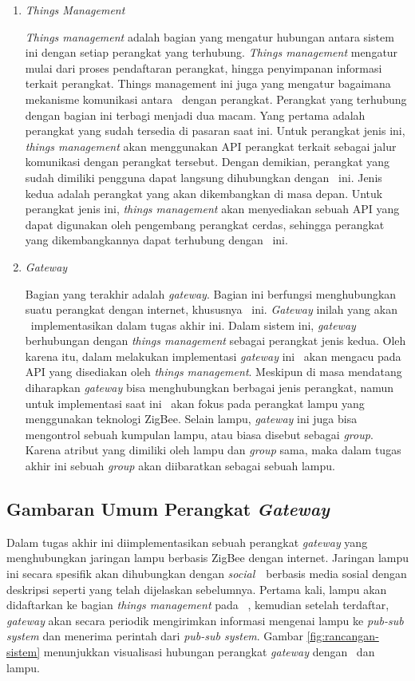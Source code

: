 \begin{enumerate}
	\item \textit{Things Management}
	
	\textit{Things management} adalah bagian yang mengatur hubungan antara sistem ini dengan setiap perangkat yang terhubung. \textit{Things management} mengatur mulai dari proses pendaftaran perangkat, hingga penyimpanan informasi terkait perangkat. Things management ini juga yang mengatur bagaimana mekanisme komunikasi antara \plat~dengan perangkat. Perangkat yang terhubung dengan bagian ini terbagi menjadi dua macam. Yang pertama adalah perangkat yang sudah tersedia di pasaran saat ini. Untuk perangkat jenis ini, \textit{things management} akan menggunakan API perangkat terkait sebagai jalur komunikasi dengan perangkat tersebut. Dengan demikian, perangkat yang sudah dimiliki pengguna dapat langsung dihubungkan dengan \plat~ini. Jenis kedua adalah perangkat yang akan dikembangkan di masa depan. Untuk perangkat jenis ini, \textit{things management} akan menyediakan sebuah API yang dapat digunakan oleh pengembang perangkat cerdas, sehingga perangkat yang dikembangkannya dapat terhubung dengan \plat~ini.
	
	\item \textit{Gateway}
	
	Bagian yang terakhir adalah \textit{gateway}. Bagian ini berfungsi menghubungkan suatu perangkat dengan internet, khususnya \plat~ini. \textit{Gateway} inilah yang akan \saya~implementasikan dalam tugas akhir ini. Dalam sistem ini, \textit{gateway} berhubungan dengan \textit{things management} sebagai perangkat jenis kedua. Oleh karena itu, dalam melakukan implementasi \textit{gateway} ini \saya~akan mengacu pada API yang disediakan oleh \textit{things management}. Meskipun di masa mendatang diharapkan \textit{gateway} bisa menghubungkan berbagai jenis perangkat, namun untuk implementasi saat ini \saya~akan fokus pada perangkat lampu yang menggunakan teknologi ZigBee. Selain lampu, \textit{gateway} ini juga bisa mengontrol sebuah kumpulan lampu, atau biasa disebut sebagai \textit{group}. Karena atribut yang dimiliki oleh lampu dan \textit{group} sama, maka dalam tugas akhir ini sebuah \textit{group} akan diibaratkan sebagai sebuah lampu.
	
\end{enumerate}

\subsection{Gambaran Umum Perangkat \textit{Gateway}}
Dalam tugas akhir ini diimplementasikan sebuah perangkat \textit{gateway} yang menghubungkan jaringan lampu berbasis ZigBee dengan internet. Jaringan lampu ini secara spesifik akan dihubungkan dengan \textit{social}\iot~\plat~berbasis media sosial dengan deskripsi seperti yang telah dijelaskan sebelumnya. Pertama kali, lampu akan didaftarkan ke bagian \textit{things management} pada \plat~, kemudian setelah terdaftar, \textit{gateway} akan secara periodik mengirimkan informasi mengenai lampu ke \textit{pub-sub system} dan menerima perintah dari \textit{pub-sub system}. Gambar \ref{fig:rancangan-sistem} menunjukkan visualisasi hubungan perangkat \textit{gateway} dengan \plat~dan lampu.

